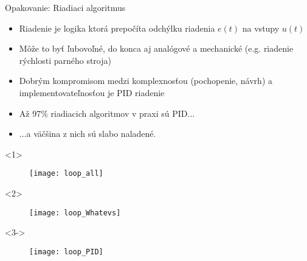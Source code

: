 \begin{frame}[t]{Opakovanie: Riadiaci algoritmus}
  \begin{itemize}
    \item<1-> Riadenie je logika ktorá prepočíta odchýlku riadenia $e(t)$ na vstupy $u(t)$
    \item<2-> Môže to byť ľubovoľné, do konca aj analógové a mechanické (e.g. riadenie rýchlosti parného stroja)
    \item<3-> Dobrým kompromisom medzi komplexnosťou (pochopenie, návrh) a implementovateľnosťou je PID riadenie
    \item<4-> Až 97\% riadiacich algoritmov v praxi sú PID... \citep{Murray2004}
    \item<5-> ...a väčšina z nich sú slabo naladené.
  \end{itemize}

\begin{onlyenv}<1>
\begin{figure}
\centering
  \texttt{[image: loop\_all]}\\
\end{figure}
\end{onlyenv}

\begin{onlyenv}<2>
\begin{figure}
\centering
  \texttt{[image: loop\_Whatevs]}\\
\end{figure}
\end{onlyenv}



\begin{onlyenv}<3->
\begin{figure}
\centering
  \texttt{[image: loop\_PID]}\\
\end{figure}
\end{onlyenv}
\end{frame}


